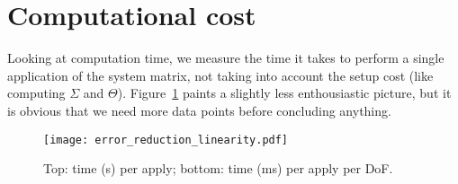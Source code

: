 \documentclass[11pt,a4paper]{amsart}
\theoremstyle{definition}
\begin{document}
\section*{Computational cost}
Looking at computation time, we measure the time it takes to perform a single
application of the system matrix, not taking into account the setup cost (like
computing $\Sigma$ and $\Theta$). Figure~\ref{fig:linearity} paints a slightly
less enthousiastic picture, but it is obvious that we need more data points
before concluding anything.
\begin{figure}[h!]
  \texttt{[image: error\_reduction\_linearity.pdf]}
  \caption{Top: time (s) per apply; bottom: time (ms) per apply per DoF.}
  \label{fig:linearity}
\end{figure}
\end{document}
